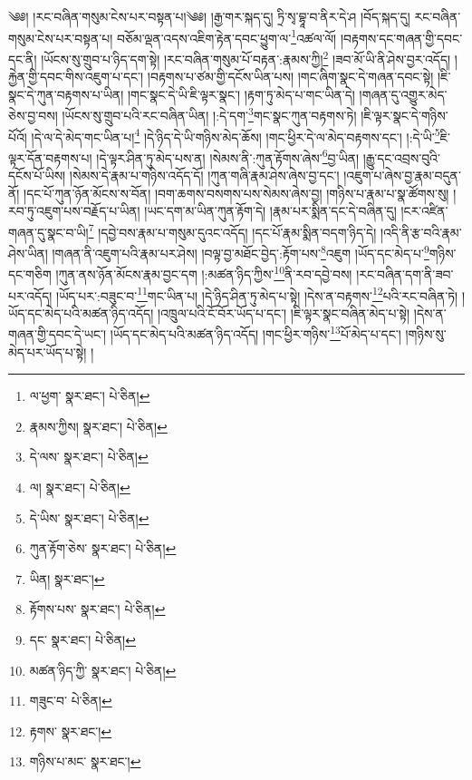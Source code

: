 \setcounter{footnote}{0} 
༄༅། །རང་བཞིན་གསུམ་ངེས་པར་བསྟན་པ།༄༅། །རྒྱ་གར་སྐད་དུ། ཏྲི་སྭ་བྷཱ་བ་ནིར་དེ་ཤ །བོད་སྐད་དུ། རང་བཞིན་གསུམ་ངེས་པར་བསྟན་པ། བཅོམ་ལྡན་འདས་འཇིག་རྟེན་དབང་ཕྱུག་ལ་\footnote{ལ་ཕྱག་  སྣར་ཐང་།  པེ་ཅིན། }འཚལ་ལོ། །བརྟགས་དང་གཞན་གྱི་དབང་དང་ནི། །ཡོངས་སུ་གྲུབ་པ་ཉིད་དག་སྟེ། །རང་བཞིན་གསུམ་པོ་བརྟན་:རྣམས་ཀྱི།\footnote{རྣམས་ཀྱིས།  སྣར་ཐང་།  པེ་ཅིན། } །ཟབ་མོ་ཡི་ནི་ཤེས་བྱར་འདོད། །རྐྱེན་གྱི་དབང་གིས་འཇུག་པ་དང་། །བརྟགས་པ་ཙམ་གྱི་དངོས་ཡིན་པས། །གང་ཞིག་སྣང་དེ་གཞན་དབང་སྟེ། །ཇི་སྣང་དེ་ཀུན་བརྟགས་པ་ཡིན། །གང་སྣང་དེ་ཡི་ཇི་ལྟར་སྣང་། །རྟག་ཏུ་མེད་པ་གང་ཡིན་དེ། །གཞན་དུ་འགྱུར་མེད་ཅེས་བྱ་བས། །ཡོངས་སུ་གྲུབ་པའི་རང་བཞིན་ཡིན། །:དེ་དག་\footnote{དེ་ལས་  སྣར་ཐང་།  པེ་ཅིན། }གང་སྣང་ཀུན་བརྟགས་ཏེ། །ཇི་ལྟར་སྣང་དེ་གཉིས་པོའོ། །དེ་ལ་དེ་མེད་གང་ཡིན་པ།\footnote{ལ།  སྣར་ཐང་།  པེ་ཅིན། } །དེ་ཉིད་དེ་ཡི་གཉིས་མེད་ཆོས། །གང་ཕྱིར་དེ་ལ་མེད་བརྟགས་དང་། །:དེ་ཡི་\footnote{དེ་ཡིས་  སྣར་ཐང་།  པེ་ཅིན། }ཇི་ལྟར་དོན་བརྟགས་པ། །དེ་ལྟར་ཤིན་ཏུ་མེད་པས་ན། །སེམས་ནི་:ཀུན་རྟོགས་ཞེས་\footnote{ཀུན་རྟོག་ཅེས་  སྣར་ཐང་།  པེ་ཅིན། }བྱ་ཡིན། །རྒྱུ་དང་འབྲས་བུའི་དངོས་པོ་ཡིས། །སེམས་དེ་རྣམ་པ་གཉིས་འདོད་དོ། །ཀུན་གཞི་རྣམ་ཤེས་ཞེས་བྱ་དང་། །འཇུག་པ་ཞེས་བྱ་རྣམ་བདུན་ནོ། །དང་པོ་ཀུན་ཉོན་མོངས་ས་བོན། །བག་ཆགས་བསགས་པས་སེམས་ཞེས་བྱ། །གཉིས་པ་རྣམ་པ་སྣ་ཚོགས་སུ། །རབ་ཏུ་འཇུག་པས་བརྗོད་པ་ཡིན། །ཡང་དག་མ་ཡིན་ཀུན་རྟོག་དེ། །རྣམ་པར་སྨིན་དང་དེ་བཞིན་དུ། །ངར་འཛིན་གཞན་དུ་སྣང་བ་ཡི།\footnote{ཡིན།  སྣར་ཐང་། } །དབྱེ་བས་རྣམ་པ་གསུམ་དུའང་འདོད། །དང་པོ་རྣམ་སྨིན་བདག་ཉིད་དེ། །འདི་ནི་རྩ་བའི་རྣམ་ཤེས་ཡིན། །གཞན་ནི་འཇུག་པའི་རྣམ་པར་ཤེས། །བལྟ་བྱ་མཐོང་བྱེད་:རྟོག་པས་\footnote{རྟོགས་པས་  སྣར་ཐང་།  པེ་ཅིན། }འཇུག །ཡོད་དང་མེད་པ་\footnote{དང་  སྣར་ཐང་།  པེ་ཅིན། }གཉིས་དང་གཅིག །ཀུན་ནས་ཉོན་མོངས་རྣམ་བྱང་དག །:མཚན་ཉིད་ཀྱིས་\footnote{མཚན་ཉིད་ཀྱི་  སྣར་ཐང་།  པེ་ཅིན། }ནི་རབ་དབྱེ་བས། །རང་བཞིན་དག་ནི་ཟབ་པར་འདོད། །ཡོད་པར་:བཟུང་བ་\footnote{གཟུང་བ་  པེ་ཅིན། }གང་ཡིན་པ། །དེ་ཉིད་ཤིན་ཏུ་མེད་པ་སྟེ། །དེས་ན་བརྟགས་\footnote{རྟགས་  སྣར་ཐང་། }པའི་རང་བཞིན་ཏེ། །ཡོད་དང་མེད་པའི་མཚན་ཉིད་འདོད། །འཁྲུལ་པའི་ངོ་བོར་ཡོད་པ་དང་། །ཇི་ལྟར་སྣང་བཞིན་མེད་པ་སྟེ། །དེས་ན་གཞན་གྱི་དབང་དེ་ཡང་། །ཡོད་དང་མེད་པའི་མཚན་ཉིད་འདོད། །གང་ཕྱིར་གཉིས་\footnote{གཉིས་པ་མང་  སྣར་ཐང་། }པོ་མེད་པ་དང་། །གཉིས་སུ་མེད་པར་ཡོད་པ་སྟེ། །
